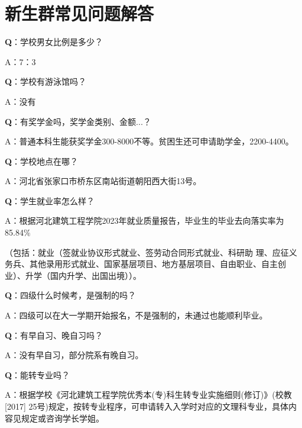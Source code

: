 \documentclass[12pt]{article} %
\begin{document}
	
		\newpage



\section{新生群常见问题解答} 
\textbf{Q}：学校男女比例是多少？

A：7：3

\textbf{Q}：学校有游泳馆吗？

A：没有

\textbf{Q}：有奖学金吗，奖学金类别、金额...？

A：普通本科生能获奖学金300-8000不等。贫困生还可申请助学金，2200-4400。

\textbf{Q}：学校地点在哪？

A：河北省张家口市桥东区南站街道朝阳西大街13号。

\textbf{Q}：学生就业率怎么样？

A：根据河北建筑工程学院2023年就业质量报告，毕业生的毕业去向落实率为 85.84$\%$

（包括：就业（签就业协议形式就业、签劳动合同形式就业、科研助
理、应征义务兵、其他录用形式就业、国家基层项目、地方基层项目、自由职业、自主创
业）、升学（国内升学、出国出境））。

\textbf{Q}：四级什么时候考，是强制的吗？

A：四级可以在大一学期开始报名，不是强制的，未通过也能顺利毕业。

\textbf{Q}：有早自习、晚自习吗？

A：没有早自习，部分院系有晚自习。

\textbf{Q}：能转专业吗？

A：根据学校《河北建筑工程学院优秀本(专)科生转专业实施细则(修订)》(校教[2017] 25号)规定，按转专业程序，可申请转入入学时对应的文理科专业，具体内容见规定或咨询学长学姐。
\end{document}
